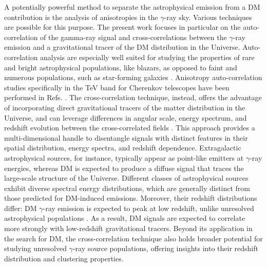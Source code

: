 \documentclass[aps,prd,a4paper,reprint,nofootinbib,superscriptaddress,floatfix,preprintnumbers]{revtex4-2}
\begin{document}
A potentially powerful method to separate the astrophysical emission from a DM contribution is the analysis of anisotropies in the $\gamma$-ray sky.
Various techniques are possible for this purpose. 
The present work focuses in particular on the auto-correlation of the gamma-ray signal and 
cross-correlations between the $\gamma$-ray emission and a gravitational tracer of the DM distribution in the Universe.
Auto-correlation analysis are especially well suited for studying the properties of rare and bright astrophysical populations, like blazars, as opposed to faint and numerous populations, such as star-forming galaxies \cite{Ando:2006mt,Ando:2013ff,Fermi-LAT:2018udj,fornasa2016angular,Korsmeier:2022cwp}.
Anisotropy auto-correlation studies specifically in the TeV band for Cherenkov telescopes have been performed in Refs. \cite{Hutten:2018wop,Hutten:2016jko,Ripken:2012db}.
The cross-correlation technique, instead, offers the advantage of incorporating direct gravitational tracers of the matter distribution in the Universe, and can leverage differences in angular scale, energy spectrum, and redshift evolution between the cross-correlated fields \cite{Camera:2012cj,Camera_2015,Fornengo:2013rga}. This approach provides a multi-dimensional handle to disentangle signals with distinct features in their spatial distribution, energy spectra, and redshift dependence. Extragalactic astrophysical sources, for instance, typically appear as point-like emitters at $\gamma$-ray energies, whereas DM is expected to produce a diffuse signal that traces the large-scale structure of the Universe. Different classes of astrophysical sources exhibit diverse spectral energy distributions, which are generally distinct from those predicted for DM-induced emissions. Moreover, their redshift distributions differ: DM $\gamma$-ray emission is expected to peak at low redshift, unlike unresolved astrophysical populations {\cite{Camera:2012cj,Camera_2015,Fornengo:2013rga}}. As a result, DM signals are expected to correlate more strongly with low-redshift gravitational tracers.
Beyond its application in the search for DM, the cross-correlation technique also holds broader potential for studying unresolved $\gamma$-ray source populations, offering insights into their redshift distribution and clustering properties.
\end{document}
